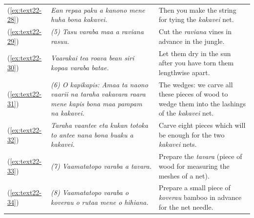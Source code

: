 \documentclass[output=paper]{langscibook}
\begin{document}
\begin{xltabular}{\textwidth}{lXX}
	(\ref{ex:text22-28})&\textit{Ean repaa paku a kanono mene huha bona kakavei.}&Then you make the string for tying the \textit{kakavei} net.\\
	(\ref{ex:text22-29})&\textit{(5) Tasu varaba maa a raviana rasuu.}&Cut the \textit{raviana} vines in advance in the jungle.\\
	(\ref{ex:text22-30})&\textit{Vaarakai tea roava bean siri kopaa varaba batae.}&Let them dry in the sun after you have torn them lengthwise apart.\\
	(\ref{ex:text22-31})&\textit{(6) O kapikapis: Amaa ta naono vaarii na taraha vakavara raara mene kapis bona maa pampam na kakavei.}&The wedges: we carve all these pieces of wood to wedge them into the lashings of the \textit{kakavei} net.\\
	(\ref{ex:text22-32})&\textit{Taraha vaantee eta kukan totoka to antee nana bona buaku a kakavei.}&Carve eight pieces which will be enough for the two \textit{kakavei} nets.\\
	(\ref{ex:text22-33})&\textit{(7) Vaamatatopo varaba a tavara.}&Prepare the \textit{tavara} (piece of wood for measuring the meshes of a net).\\
	(\ref{ex:text22-34})&\textit{(8) Vaamatatopo varaba o koverau o rutaa mene o hihiana.}&Prepare a small piece of \textit{koverau} bamboo in advance for the net needle.\\
\end{xltabular}
\end{document}
